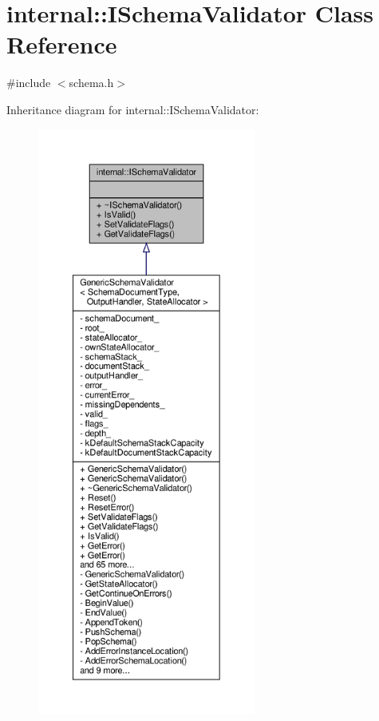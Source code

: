 \hypertarget{classinternal_1_1ISchemaValidator}{}\section{internal\+:\+:I\+Schema\+Validator Class Reference}
\label{classinternal_1_1ISchemaValidator}


{\ttfamily \#include $<$schema.\+h$>$}



Inheritance diagram for internal\+:\+:I\+Schema\+Validator\+:
\nopagebreak
\begin{figure}[H]
\begin{center}
\leavevmode
\includegraphics[height=550pt]{classinternal_1_1ISchemaValidator__inherit__graph}
\end{center}
\end{figure}


